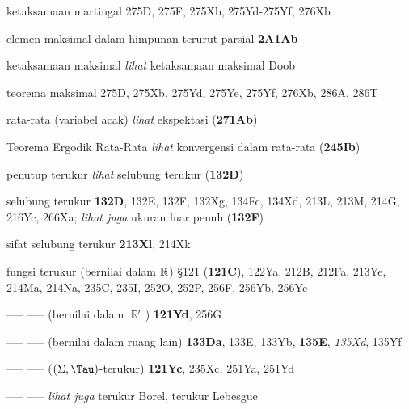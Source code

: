 ketaksamaan martingal 275D, 275F, 275Xb,
275Yd-275Yf, 
276Xb







elemen maksimal dalam himpunan terurut parsial {\bf 2A1Ab}








ketaksamaan maksimal {\it lihat} ketaksamaan maksimal Doob


teorema maksimal 275D, 275Xb, 275Yd, 275Ye, 275Yf,
276Xb, 286A, 286T


















rata-rata (variabel acak) {\it lihat} ekspektasi ({\bf 271Ab})




{Teorema Ergodik Rata-Rata }
  {\it lihat} konvergensi dalam rata-rata ({\bf 245Ib})








penutup terukur {\it lihat} selubung terukur ({\bf 132D})

selubung terukur {\bf 132D}, 132E, 132F, 132Xg, 134Fc, 134Xd,
  213L, 213M, 214G, 216Yc, 266Xa;  
  {\it lihat juga }
  ukuran luar penuh ({\bf 132F})

sifat selubung terukur {\bf 213Xl}, 214Xk


fungsi terukur (bernilai dalam $\Bbb R$) \S121 ({\bf 121C}),
122Ya,
  212B, 212Fa, 213Ye, 214Ma, 214Na, 235C, 235I, 252O, 252P, 256F, 256Yb,
256Yc

----- -----  (bernilai dalam $\BbbR^r$) {\bf 121Yd},
  256G
  

----- -----  (bernilai dalam ruang lain) {\bf 133Da}, 133E, 133Yb,
{\bf 135E}, {\it 135Xd}, 135Yf  

----- -----  ($(\Sigma,\Tau)$-terukur) {\bf 121Yc},
  235Xc, 251Ya, 251Yd
  

----- -----  {\it lihat juga} terukur Borel, terukur Lebesgue






